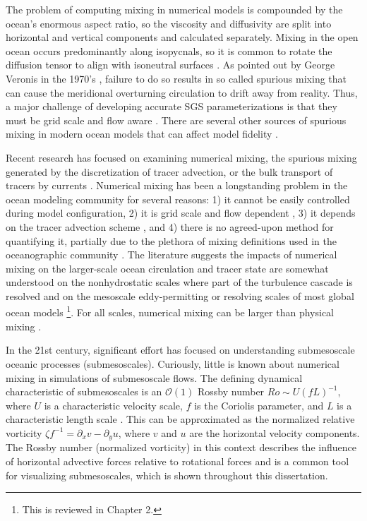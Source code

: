 The problem of computing mixing in numerical models is compounded by the ocean's enormous aspect ratio, so the viscosity and diffusivity are split into horizontal and vertical components and calculated separately. Mixing in the open ocean occurs predominantly along isopycnals, so it is common to rotate the diffusion tensor to align with isoneutral surfaces \citep{redi1982oceanic}. As pointed out by George Veronis in the 1970's \citep{veronis1975role}, failure to do so results in so called spurious mixing that can cause the meridional overturning circulation to drift away from reality. Thus, a major challenge of developing accurate SGS parameterizations is that they must be grid scale and flow aware \citep{fox2019challenges}. There are several other sources of spurious mixing in modern ocean models that can affect model fidelity \citep{megann2022assessment, Schlichting23}.  

Recent research has focused on examining numerical mixing, the spurious mixing generated by the discretization of tracer advection, or the bulk transport of tracers by currents \citep{Griffies_2000, Burchard_2008}. Numerical mixing has been a longstanding problem in the ocean modeling community for several reasons: 1) it cannot be easily controlled during model configuration, 2) it is grid scale and flow dependent \citep{Burchard_2008}, 3) it depends on the tracer advection scheme \citep{fofonova2021plume, Kalra_2019}, and 4) there is no agreed-upon method for quantifying it, partially due to the plethora of mixing definitions used in the oceanographic community \citep{Klingbeil_2014, MacCready_2018, winters1995available}. The literature suggests the impacts of numerical mixing on the larger-scale ocean circulation and tracer state are somewhat understood on the nonhydrostatic scales where part of the turbulence cascade is resolved \citep[e.g., large eddy simulations, ][]{domaradzki2003effective, thornber2007implicit} and on the mesoscale eddy-permitting or resolving scales of most global ocean models \footnote{This is reviewed in Chapter 2.}. For all scales, numerical mixing can be larger than physical mixing \citep{domaradzki2003effective, Griffies_2000, Holmes_2021, Wang_2021}. 

In the 21st century, significant effort has focused on understanding submesoscale oceanic processes (submesoscales). Curiously, little is known about numerical mixing in simulations of submesoscale flows. The defining dynamical characteristic of submesoscales is an $\mathcal{O}(1)$ Rossby number $Ro \sim U(fL)^{-1}$, where $U$ is a characteristic velocity scale, $f$ is the Coriolis parameter, and $L$ is a characteristic length scale \citep{McWilliams_2016,taylor2023submesoscale}. This can be approximated as the normalized relative vorticity $\zeta f^{-1}= \partial_x v - \partial_y u$, where $v$ and $u$ are the horizontal velocity components. The Rossby number (normalized vorticity) in this context describes the influence of horizontal advective forces relative to rotational forces and is a common tool for visualizing submesoscales, which is shown throughout this dissertation. 

